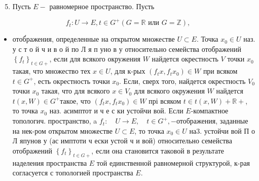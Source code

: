 \documentclass[10pt]{article}
\begin{document}
\begin{enumerate}

  \setcounter{enumi}{4}

  \item Пусть $E-$ равномерное пространство. Пусть

\end{enumerate}



\[

f_{t}: U \longrightarrow E, t \in G^{+}(G=\mathbb{R} \text { или } G=\mathbb{Z}),

\]



\begin{itemize}

  \item отоб́ражения, определенные на открытом множестве $U \subset E$. Точка $x_{0} \in U$ наз. у с т о й ч и в о й по Л я п уно в у относительно семейства отображений $\left\{f_{t}\right\}_{t \in G+}$, если для всякого окружения $W$ найдется окрестность $V$ точки $x_{0}$ такая, что множество тех $x \in U$, для к-рых $\left(f_{t} x, f_{t} x_{0}\right) \in W$ при всяком $t \in G^{+}$, есть окрестность точки $x_{0}$. Если, сверх того, найдется окрестность $V_{0}$ точки $x_{0}$ такая, что для всякого $x \in V_{0}$ для всякого окружения $W$ найдется $t(x, W) \in G^{+}$такое, что $\left(f_{t} x, f_{t} x_{0}\right) \in W$ прі всяком $t \in t(x, W)+\mathbb{R}+$, то точка $x_{0}$ наз. асимптот и ч е с ки устойчи вой. Если $E$-компактное топологич. пространство, a $f_{t}: \quad U \longrightarrow E, \quad t \in G^{+},-$отображения, заданные на нек-ром открытом множестве $U \subset E$, то точка $x_{0} \in U$ на3. устойчи вой П о Л япунов у (ас имптоти ч ески устой ч и вой) относительно семейства отображений $\left\{f_{t}\right\}_{t \in G+}$, если она становится таковой в результате наделения пространства $E$ той единственной равномерной структурой, к-рая согласуется с топологией пространства $E$.

\end{itemize}
\end{document}
